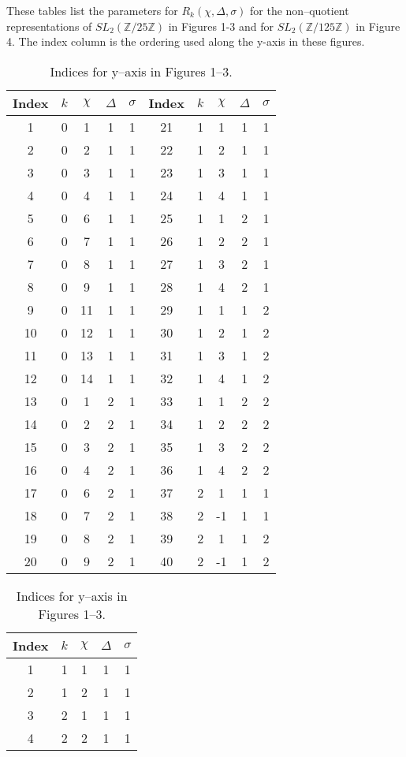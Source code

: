 \documentclass[12pt,reqno]{amsart}
\theoremstyle{remark}
\numberwithin{table}{section}
\newcommand{\Z}{\mathbb Z}
\begin{document}
These tables list  the parameters for $R_k(\chi,\Delta,\sigma)$ for the non--quotient representations of $SL_2(\Z/25\Z)$ in Figures 1-3 and for $SL_2(\Z/125\Z)$ in Figure 4. The index column is the ordering used along the y-axis in these figures. 

\begin{table}[!h]
\begin{tabular}{|c|c|c|c|c||c|c|c|c|c|}
\hline
Index&$k$&$\chi$&$\Delta$&$\sigma$&Index&$k$&$\chi$&$\Delta$&$\sigma$\\
\hline
\hline
1&0&1&1&1    & 21 &1&1&1&1\\
\hline
2&0&2&1&1    & 22 &1&2&1&1\\
\hline
3&0&3&1&1    & 23 &1&3&1&1\\
\hline
4&0&4&1&1    & 24 &1&4&1&1\\
\hline
5&0&6&1&1 & 25 &1&1&2&1\\ 
\hline
6&0&7&1&1 & 26 &1&2&2&1\\ 
\hline
7&0&8&1&1 & 27 &1&3&2&1\\ 
\hline
8&0&9&1&1 & 28 &1&4&2&1\\ 
\hline
9&0&11&1&1 & 29 &1&1&1&2\\ 
\hline
10&0&12&1&1 & 30 &1&2&1&2\\ 
\hline 
11&0&13&1&1 & 31 &1&3&1&2\\ 
\hline 
12&0&14&1&1 & 32 &1&4&1&2\\ 
\hline 
13&0&1&2&1  & 33 &1&1&2&2\\ 
\hline 
14&0&2&2&1 & 34 &1&2&2&2\\ 
\hline 
15&0&3&2&1 & 35 &1&3&2&2\\ 
\hline
16&0&4&2&1 & 36 &1&4&2&2\\ 
\hline
17&0&6&2&1& 37&2&1&1&1\\ 
\hline
18&0&7&2&1& 38&2&-1&1&1\\ 
\hline
19&0&8&2&1& 39&2&1&1&2\\ 
\hline
20&0&9&2&1 & 40&2&-1&1&2\\ 
\hline
\end{tabular}
\caption{Indices for y--axis in Figures 1--3.}
\end{table}


\begin{table}[!h]
\begin{tabular}{|c|c|c|c|c|}
\hline
Index&$k$&$\chi$&$\Delta$&$\sigma$\\
\hline
\hline
1&1&1&1&1\\
\hline
2&1&2&1&1\\
\hline

3&2&1&1&1\\
\hline

4&2&2&1&1\\
\hline

\end{tabular}
\caption{Indices for y--axis in Figures 1--3.}
\end{table}
\end{document}
